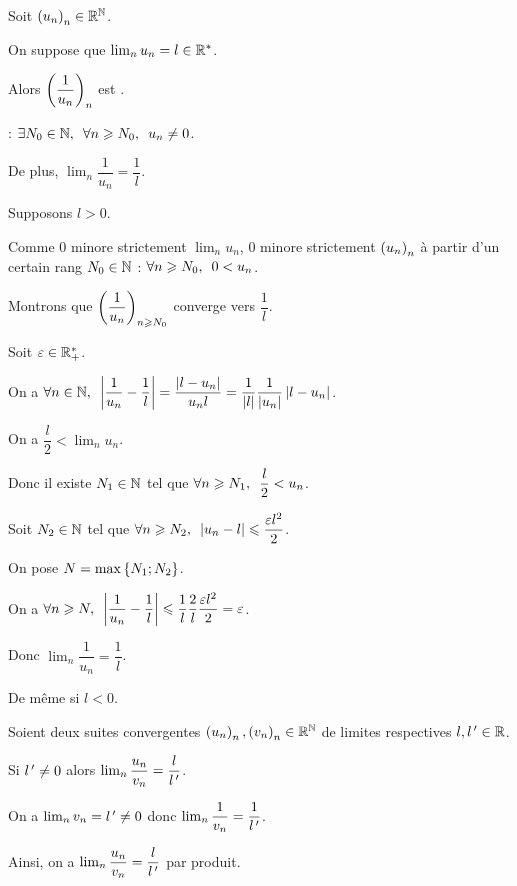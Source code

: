 \begin{prop}
Soit \(\left(u_n\right)_n\in\mathbb{R}^{\mathbb{N}}\).

On suppose que \(\lim_nu_n=l\in\mathbb{R}^*\).

Alors \(\left(\dfrac{1}{u_n}\right)_n\) est .

\Cad : \(\quantifs{\exists N_0\in\N;\forall n\geq N_0}u_n\not=0\).

De plus, \(\lim_n\dfrac{1}{u_n}=\dfrac{1}{l}\).
\end{prop}

\begin{dem}
Supposons \(l>0\).

Comme \(0\) minore strictement \(\lim_nu_n\), \(0\) minore strictement \(\left(u_n\right)_n\) à partir d'un certain rang \(N_0\in\mathbb{N}\) : \(\quantifs{\forall n\geq N_0}0<u_n\).

Montrons que \(\left(\dfrac{1}{u_n}\right)_{n\geqslant N_0}\) converge vers \(\dfrac{1}{l}\).

Soit \(\varepsilon\in\mathbb{R}_+^*\).

On a \(\quantifs{\forall n\in\N}\abs{\dfrac{1}{u_n}-\dfrac{1}{l}}=\dfrac{\abs{l-u_n}}{u_nl}=\dfrac{1}{\abs{l}}\dfrac{1}{\abs{u_n}}\abs{l-u_n}\).

On a \(\dfrac{l}{2}<\lim_nu_n\).

Donc il existe \(N_1\in\mathbb{N}\) tel que \(\quantifs{\forall n\geq N_1}\dfrac{l}{2}<u_n\).

Soit \(N_2\in\mathbb{N}\) tel que \(\quantifs{\forall n\geq N_2}\abs{u_n-l}\leq\dfrac{\epsilon l^2}{2}\).

On pose \(N=\max\left\lbrace N_1;N_2\right\rbrace\).

On a \(\quantifs{\forall n\geq N}\abs{\dfrac{1}{u_n}-\dfrac{1}{l}}\leq\dfrac{1}{l}\dfrac{2}{l}\dfrac{\epsilon l^2}{2}=\epsilon\).

Donc \(\lim_n\dfrac{1}{u_n}=\dfrac{1}{l}\).

De même si \(l<0\).
\end{dem}

\begin{cor}
Soient deux suites convergentes \(\left(u_n\right)_n,\left(v_n\right)_n\in\mathbb{R}^{\mathbb{N}}\) de limites respectives \(l,l^{\,\prime}\in\mathbb{R}\).

Si \(l^{\,\prime}\not=0\) alors \(\lim_n\dfrac{u_n}{v_n}=\dfrac{l}{l^{\,\prime}}\).
\end{cor}

\begin{dem}
On a \(\lim_nv_n=l^{\,\prime}\not=0\) donc \(\lim_n\dfrac{1}{v_n}=\dfrac{1}{l^{\,\prime}}\).

Ainsi, on a \(\lim_n\dfrac{u_n}{v_n}=\dfrac{l}{l^{\,\prime}}\) par produit.
\end{dem}

